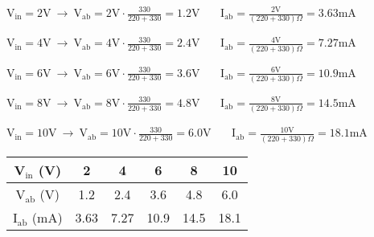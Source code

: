 \documentclass{article}
\begin{document}
{V$\displaystyle _\text{in} = 2\text{V} \ \rightarrow \ \text{V}_\text{ab} = 2\text{V} \cdot \frac{330}{220 + 330} = 1.2\text{V} $} \ \ \ {$\displaystyle \text{I}_\text{ab} = \frac{2\text{V}}{(220 + 330)\Omega} = 3.63\text{mA} $}

\vspace{4mm}

{V$\displaystyle _\text{in} = 4\text{V} \ \rightarrow \ \text{V}_\text{ab} = 4\text{V} \cdot \frac{330}{220 + 330} = 2.4\text{V} $} \ \ \ {$\displaystyle \text{I}_\text{ab} = \frac{4\text{V}}{(220 + 330)\Omega} = 7.27\text{mA} $}

\vspace{4mm}

{V$\displaystyle _\text{in} = 6\text{V} \ \rightarrow \ \text{V}_\text{ab} = 6\text{V} \cdot \frac{330}{220 + 330} = 3.6\text{V} $} \ \ \ {$\displaystyle \text{I}_\text{ab} = \frac{6\text{V}}{(220 + 330)\Omega} = 10.9\text{mA} $}

\vspace{4mm}

{V$\displaystyle _\text{in} = 8\text{V} \ \rightarrow \ \text{V}_\text{ab} = 8\text{V} \cdot \frac{330}{220 + 330} = 4.8\text{V} $} \ \ \ {$\displaystyle \text{I}_\text{ab} = \frac{8\text{V}}{(220 + 330)\Omega} = 14.5\text{mA} $}

\vspace{4mm}

{V$\displaystyle _\text{in} = 10\text{V} \ \rightarrow \ \text{V}_\text{ab} = 10\text{V} \cdot \frac{330}{220 + 330} = 6.0\text{V} $} \ \ \ {$\displaystyle \text{I}_\text{ab} = \frac{10\text{V}}{(220 + 330)\Omega} = 18.1\text{mA} $}

\vspace{4mm}

\begin{center}
    \large
    \begin{tabular}{ |c| c c c c c | } 
    \hline
        V$_\text{in}$ (V) & 2 & 4 & 6 & 8 & 10\\
        \hline
        V$_\text{ab}$ (V) & 1.2 & 2.4 & 3.6 & 4.8 & 6.0 \\
        \hline
        I$_\text{ab}$ (mA) & 3.63 & 7.27 & 10.9 & 14.5 & 18.1 \\
        \hline
    \end{tabular}
\end{center}
\end{document}

